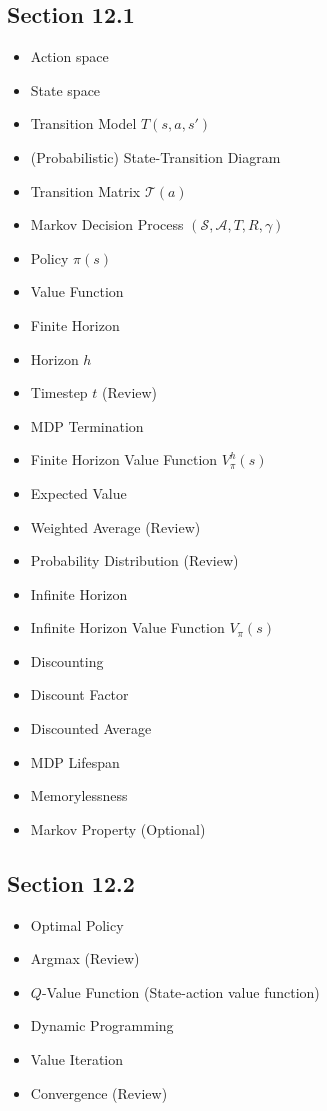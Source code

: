     \subsection*{Section 12.1}
    \begin{itemize}
        \item Action space
        \item State space
        \item Transition Model $T(s,a,s')$
        \item (Probabilistic) State-Transition Diagram
        \item Transition Matrix $\mathcal{T}(a)$
        \item Markov Decision Process $(\mathcal{S},\mathcal{A},T,R,\gamma)$
        \item Policy $\pi(s)$
        \item Value Function
        \item Finite Horizon
        \item Horizon $h$
        \item Timestep $t$ (Review)
        \item MDP Termination
        \item Finite Horizon Value Function $V_{\pi}^h(s)$
        \item Expected Value
        \item Weighted Average (Review)
        \item Probability Distribution (Review)
        \item Infinite Horizon
        \item Infinite Horizon Value Function $V_{\pi}(s)$
        \item Discounting
        \item Discount Factor
        \item Discounted Average
        \item MDP Lifespan
        \item Memorylessness 
        \item Markov Property (Optional)
        
    \end{itemize}

    \subsection*{Section 12.2}
    \begin{itemize}
        \item Optimal Policy
        \item Argmax (Review)
        \item $Q$-Value Function (State-action value function)
        \item Dynamic Programming
        \item Value Iteration
        \item Convergence (Review)
    \end{itemize}
    

